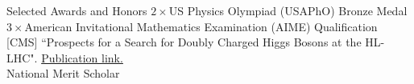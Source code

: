 \documentclass[
	11pt, %
]{resume} %
\begin{document}
\begin{rSection}{Selected Awards and Honors}
$2\times$US Physics Olympiad (USAPhO) Bronze Medal \\ $3\times$American Invitational Mathematics Examination (AIME) Qualification \\ {[CMS]} ``Prospects for a Search for Doubly Charged Higgs Bosons at the HL-LHC". \href{https://cds.cern.ch/record/2808604?ln=en}{Publication link.} \\ National Merit Scholar
\end{rSection}







\end{document}
